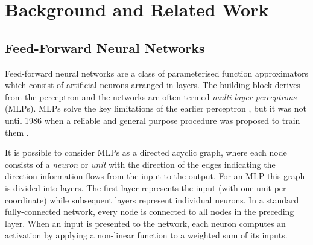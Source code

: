 \chapter{Background and Related Work}\label{C:bg}
\section{Feed-Forward Neural Networks}
Feed-forward neural networks are a class of parameterised function approximators which consist of
artificial neurons arranged in layers. The building block derives from the perceptron
\autocite{Rosenblatt1958} and the networks are often termed \emph{multi-layer perceptrons} (MLPs). MLPs solve
the key limitations of the earlier perceptron \autocite{Minsky1969}, but it was not until 1986
when a reliable and general purpose procedure was 
proposed to train them \autocite{Rumelhart1986}.

It is possible to consider MLPs as a directed acyclic graph, where each node consists
of a \emph{neuron} or \emph{unit} with the direction of the edges indicating the direction information flows from
the input to the output. For an MLP this graph is divided into layers.
The first layer represents the input (with one unit per coordinate) while subsequent layers
represent individual neurons. In a standard fully-connected network, every node is connected to all
nodes in the preceding layer. When an input is presented to the network, each neuron computes
an activation by applying a non-linear function to a weighted sum of its inputs. 

